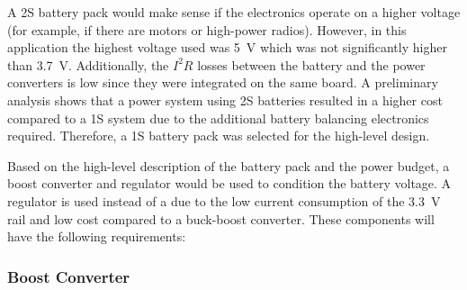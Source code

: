 \documentclass{report}
\begin{document}
A 2S battery pack would make sense if the electronics operate on a higher voltage (for example, if there are motors or high-power radios). However, in this application the highest voltage used was \SI{5}{\volt} which was not significantly higher than \SI{3.7}{\volt}. Additionally, the $I^2R$ losses between the battery and the power converters is low since they were integrated on the same board. A preliminary analysis shows that a power system using 2S batteries resulted in a higher cost compared to a 1S system due to the additional battery balancing electronics required. Therefore, a 1S battery pack was selected for the high-level design.

Based on the high-level description of the battery pack and the power budget, a boost converter and regulator would be used to condition the battery voltage. A regulator is used instead of a due to the low current consumption of the \SI{3.3}{\volt} rail and low cost compared to a buck-boost converter. These components will have the following requirements:

\subsubsection{Boost Converter}
\end{document}
